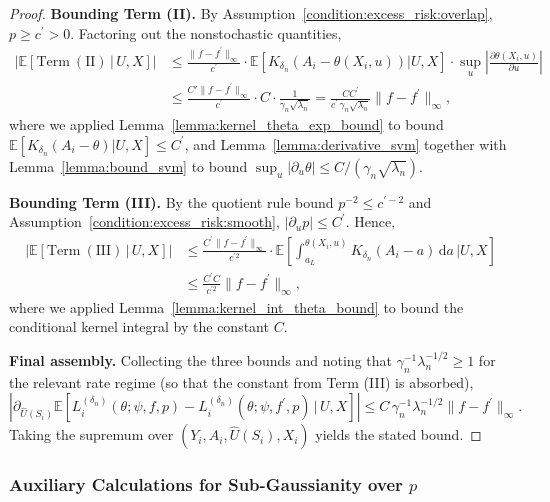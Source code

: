 \documentclass[12pt]{article}
\newcommand{\E}{\mathbb{E}}
\begin{document}
\begin{proof}
\noindent\textbf{Bounding Term (II).}
By Assumption~\ref{condition:excess_risk:overlap}, $p\geq c^\prime>0$.  Factoring out the nonstochastic quantities,
\begin{align*}
\left|\E\!\left[\mathrm{Term\ (II)}\,\big|\,U,X\right]\right|
&\leq \frac{\|f-f^\prime\|_\infty}{c^\prime}\cdot\E\!\left[K_{\delta_n}\!\left(A_i-\theta(X_i,u)\right)\Big|U,X\right]\cdot\sup_u\left|\frac{\partial\theta(X_i,u)}{\partial u}\right|\\
&\leq \frac{C'\|f-f^\prime\|_\infty}{c^\prime}\cdot C\cdot\frac{1}{\gamma_n\sqrt{\lambda_n}}
= \frac{CC^\prime}{c^\prime\,\gamma_n\sqrt{\lambda_n}}\|f-f^\prime\|_\infty,
\end{align*}
where we applied Lemma~\ref{lemma:kernel_theta_exp_bound} to bound $\E[K_{\delta_n}(A_i-\theta)|U,X]\leq C^\prime$, and Lemma~\ref{lemma:derivative_svm} together with Lemma~\ref{lemma:bound_svm} to bound $\sup_u|\partial_u\theta|\leq C/(\gamma_n\sqrt{\lambda_n})$.

\noindent\textbf{Bounding Term (III).}
By the quotient rule bound $p^{-2}\leq c^{\prime-2}$ and Assumption~\ref{condition:excess_risk:smooth}, $|\partial_u p|\leq C^\prime$.  Hence,
\begin{align*}
\left|\E\!\left[\mathrm{Term\ (III)}\,\big|\,U,X\right]\right|
&\leq \frac{C^\prime\|f-f^\prime\|_\infty}{c^{\prime 2}}\cdot\E\!\left[\int_{a_L}^{\theta(X_i,u)}K_{\delta_n}(A_i-a)\,\mathrm{d}a\,\Bigg|U,X\right]\\
&\leq \frac{C^\prime C}{c^{\prime 2}}\|f-f^\prime\|_\infty,
\end{align*}
where we applied Lemma~\ref{lemma:kernel_int_theta_bound} to bound the conditional kernel integral by the constant $C$.

\noindent\textbf{Final assembly.}
Collecting the three bounds and noting that $\gamma_n^{-1}\lambda_n^{-1/2}\geq 1$ for the relevant rate regime (so that the constant from Term (III) is absorbed),
$$\left|\partial_{\widehat U(S_i)}\E\!\left[L^{(\delta_n)}_i(\theta;\psi,f,p) - L^{(\delta_n)}_i(\theta;\psi,f^\prime,p)\,\big|\,U,X\right]\right|
\leq C\,\gamma_n^{-1}\lambda_n^{-1/2}\|f-f^\prime\|_\infty.$$
Taking the supremum over $(Y_i,A_i,\widehat{U}(S_i),X_i)$ yields the stated bound.
\end{proof}


\subsubsection{Auxiliary Calculations for Sub-Gaussianity over $p$}
\end{document}
